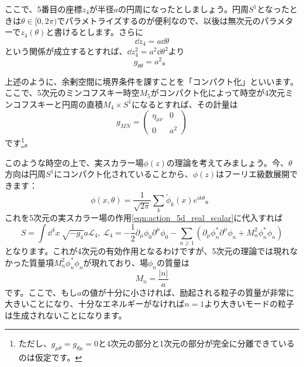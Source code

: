 \documentclass[unicode,a4paper,10pt,ja=standard,lualatex]{bxjsarticle}
\begin{document}
ここで、5番目の座標$z_{4}$が半径$a$の円周になったとしましょう。円周$S^{1}$となったときは$\theta\in[0,2\pi)$でパラメトライズするのが便利なので、以後は無次元のパラメターで$z_{4}(\theta)$と書けるとします。さらに
\begin{equation}
   \dd z_{4}
   =
   a\dd \theta
\end{equation}
という関係が成立するとすれば、$\dd z_{4}^2=a^2\dd \theta^2$より
\begin{equation}
   g_{\theta\theta}=a^2
   。
\end{equation}

上述のように、余剰空間に境界条件を課すことを「コンパクト化」といいます。ここで、5次元のミンコフスキー時空$M_{5}$がコンパクト化によって時空が4次元ミンコフスキーと円周の直積$M_{4}\times S^{1}$になるとすれば、その計量は
\begin{equation}
   g_{MN}
   =
   \begin{pmatrix}
      \eta_{\mu\nu} & 0 \\
      0 & a^2
   \end{pmatrix}
\end{equation}
です\footnote{
   ただし、$g_{\mu\theta}=g_{\theta\mu}=0$と4次元の部分と1次元の部分が完全に分離できているのは仮定です。
}。

このような時空の上で、実スカラー場$\phi(z)$の理論を考えてみましょう。今、$\theta$方向は円周$S^{1}$にコンパクト化されていることから、$\phi(z)$はフーリエ級数展開できます：
\begin{equation}
   \phi(x,\theta)
   =
   \frac{1}{\sqrt{2\pi}}
   \sum_{k}\tilde{\phi}_{k}(x)e^{ik\theta}
   。
\end{equation}
これを5次元の実スカラー場の作用\eqref{eqn:action_5d_real_scalar}に代入すれば
\begin{equation}
   S
   =
   \int\dd^4x\ 
   \sqrt{-g_{4}}a\mathcal{L}_{4}
   ,\ 
   \mathcal{L}_{4}
   =
   -
   \frac{1}{2}\partial_{\mu}\phi_{0}\partial^{\mu}\phi_{0}
   -
   \sum_{n\geq 1}
   \left(  
      \partial_{\mu}\phi^{\ast}_{n}\partial^{\mu}\phi_{n}
      +
      M_{n}^2 \phi_{n}^{\ast}\phi_{n}
   \right)
\end{equation}
となります。これが4次元の有効作用となるわけですが、5次元の理論では現れなかった質量項$M_{n}^2 \phi_{n}^{\ast}\phi_{n}$が現れており、場$\phi_{n}$の質量は
\begin{equation}
   M_{n}
   =
   \frac{|n|}{a}
\end{equation}
です。ここで、もし$a$の値が十分に小さければ、励起される粒子の質量が非常に大きいことになり、十分なエネルギーがなければ$n=1$より大きいモードの粒子は生成されないことになります。
\end{document}

